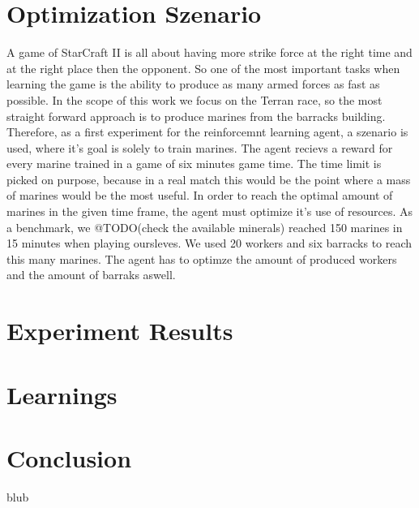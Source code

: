 \documentclass[12pt,a4paper]{article}
\begin{document}
\section{Optimization Szenario}
A game of StarCraft II is all about having more strike force at the right time and at the right place then the opponent.
So one of the most important tasks when learning the game is the ability to produce as many armed forces as fast as possible.
In the scope of this work we focus on the Terran race, so the most straight forward approach is to produce marines from the barracks building.
Therefore, as a first experiment for the reinforcemnt learning agent, a szenario is used, where it's goal is solely to train marines.
The agent recievs a reward for every marine trained in a game of six minutes game time. The time limit is picked on purpose, because in a real match this would be the point where a mass of marines would be the most useful.
In order to reach the optimal amount of marines in the given time frame, the agent must optimize it's use of resources.
As a benchmark, we @TODO(check the available minerals) reached 150 marines in 15 minutes when playing oursleves. We used 20 workers and six barracks to reach this many marines.
The agent has to optimze the amount of produced workers and the amount of barraks aswell. 
\section{Experiment Results}
\section{Learnings}
\section{Conclusion}
blub\cite{Mnih2016}
\begin{appendix}
    \listoffigures
    \listoftables
    
\end{appendix}


\end{document}
